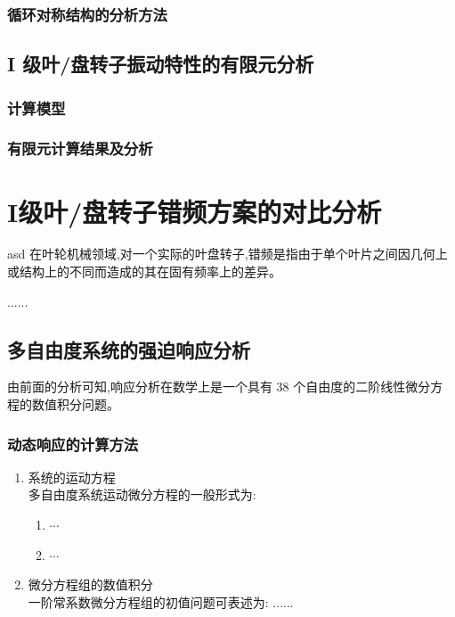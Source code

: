 \documentclass[doctor, openright, twoside]{gdutthesis}
\begin{document}
\subsection{循环对称结构的分析方法}
\section{I 级叶/盘转子振动特性的有限元分析}
\subsection{计算模型}

\subsection{有限元计算结果及分析}

\chapter{I级叶/盘转子错频方案的对比分析}
asd
在叶轮机械领域,对一个实际的叶盘转子,错频是指由于单个叶片之间因几何上
或结构上的不同而造成的其在固有频率上的差异。\par

......\par

\section{多自由度系统的强迫响应分析}

由前面的分析可知,响应分析在数学上是一个具有 38 个自由度的二阶线性微分方
程的数值积分问题\cite{article}。\par

\subsection{动态响应的计算方法}

\begin{enumerate}
\item 系统的运动方程\\
多自由度系统运动微分方程的一般形式为:
\begin{enumerate}
\item $\cdots$
\item $\cdots$
\end{enumerate}
\item 微分方程组的数值积分\\
一阶常系数微分方程组的初值问题可表述为: ......
\end{enumerate}
\end{document}
